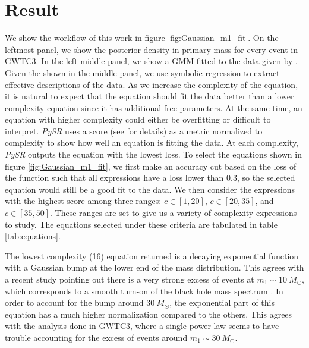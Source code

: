 \documentclass[nohyperref]{article}
\newcommand\pysr{\textit{PySR}\xspace}
\theoremstyle{plain}
\theoremstyle{definition}
\theoremstyle{remark}
\begin{document}
\section{Result}
\label{sec:result}

We show the workflow of this work in figure \ref{fig:Gaussian_m1_fit}.
On the leftmost panel, we show the posterior density in primary mass for every event in GWTC3.
In the left-middle panel, we show a GMM fitted to the data given by \cite{Tiwari:2020vym}.
Given the \ppd shown in the middle panel, we use symbolic regression to extract effective descriptions of the data. 
As we increase the complexity of the equation, it is natural to expect that the equation should fit the data better than a lower complexity equation since it has additional free parameters.
At the same time, an equation with higher complexity could either be overfitting or difficult to interpret.
\pysr uses a score (see \citealt{cranmerDiscoveringSymbolicModels2020} for details) as a metric normalized to complexity to show how well an equation is fitting the data.
At each complexity, \pysr outputs the equation with the lowest loss.
To select the equations shown in figure \ref{fig:Gaussian_m1_fit}, we first make an accuracy cut based on the loss of the function such that all expressions have a loss lower than $0.3$, so the selected equation would still be a good fit to the data.
We then consider the expressions with the highest score among three ranges: $c\in [1, 20]$,
$c\in[20, 35]$, and $c\in[35, 50]$.
These ranges are set to give us a variety of complexity expressions to study.
The equations selected under these criteria are tabulated in table \ref{tab:equations}.

The lowest complexity (16) equation returned is a decaying exponential function with a Gaussian bump at the lower end of the mass distribution.
This agrees with a recent study pointing out there is a very strong excess of events at $m_{1}\sim 10\ M_{\odot}$,
which corresponds to a smooth turn-on of the black hole mass spectrum \cite{Talbot:2018cva}.
In order to account for the bump around $30\ M_{\odot}$,
the exponential part of this equation has a much higher normalization compared to the others.
This agrees with the analysis done in GWTC3, where a single power law seems to have trouble accounting for the excess of events around $m_{1}\sim 30\ M_{\odot}$\cite{LIGOScientific:2021psn}.
\end{document}
